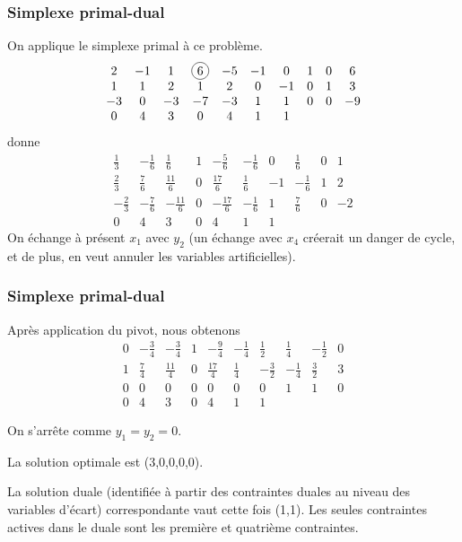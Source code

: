 \documentclass[t,usepdftitle=false]{beamer}
\newcommand*\circled[1]{\tikz[baseline=(char.base)]{
    \node[shape=circle,draw,inner sep=2pt] (char) {#1};}}
\begin{document}
\begin{frame}
\frametitle{Simplexe primal-dual}

On applique le simplexe primal à ce problème.
\[
\begin{matrix}
2 & -1 & 1 & \circled{6} & -5 & -1 & 0 & 1 & 0 & 6 \\
1 & 1 & 2 & 1 & 2 & 0 & -1 & 0 & 1 & 3 \\
-3 & 0 & -3 & -7 & -3 & 1 & 1 & 0 & 0 & -9 \\
0 & 4 & 3 & 0 & 4 & 1 & 1
\end{matrix}
\]
donne
\[
\begin{matrix}
\frac{1}{3} & -\frac{1}{6} & \frac{1}{6} & 1 & -\frac{5}{6} & -\frac{1}{6} & 0 & \frac{1}{6} & 0 & 1 \\
\frac{2}{3} & \frac{7}{6} & \frac{11}{6} & 0 & \frac{17}{6} & \frac{1}{6} & -1 & -\frac{1}{6}  & 1 & 2 \\
-\frac{2}{3} & -\frac{7}{6} & -\frac{11}{6} & 0 & -\frac{17}{6} & -\frac{1}{6} & 1 & \frac{7}{6} & 0 & -2 \\
0 & 4 & 3 & 0 & 4 & 1 & 1
\end{matrix}
\]
On échange à présent $x_1$ avec $y_2$ (un échange avec $x_4$ créerait un danger de cycle, et de plus, en veut annuler les variables artificielles).

\end{frame}

\begin{frame}
\frametitle{Simplexe primal-dual}

Après application du pivot, nous obtenons
\[
\begin{matrix}
0 & -\frac{3}{4} & -\frac{3}{4} & 1 & -\frac{9}{4} & -\frac{1}{4} & \frac{1}{2} & \frac{1}{4} & -\frac{1}{2} & 0 \\
1 & \frac{7}{4} & \frac{11}{4} & 0 & \frac{17}{4} & \frac{1}{4} & -\frac{3}{2} & -\frac{1}{4} & \frac{3}{2} & 3 \\
0 & 0 & 0 & 0 & 0 & 0 & 0 & 1 & 1 & 0 \\
0 & 4 & 3 & 0 & 4 & 1 & 1
\end{matrix}
\]

\mbox{}

On s'arrête comme $y_1 = y_2 = 0$.

\mbox{}

La solution optimale est (3,0,0,0,0).

\mbox{}

La solution duale (identifiée à partir des contraintes duales au niveau des variables d'écart) correspondante vaut cette fois (1,1). Les seules contraintes actives dans le duale sont les première et quatrième contraintes.

\end{frame}
\end{document}
